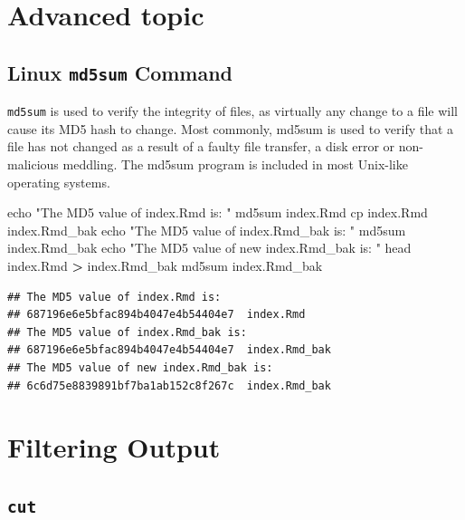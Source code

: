 \documentclass[]{book}
\makeatletter
\newenvironment{Shaded}{\begin{snugshade}}{\end{snugshade}}
\newcommand{\BuiltInTok}[1]{#1}
\newcommand{\ExtensionTok}[1]{#1}
\newcommand{\FunctionTok}[1]{\textcolor[rgb]{0.00,0.00,0.00}{#1}}
\newcommand{\NormalTok}[1]{#1}
\newcommand{\OperatorTok}[1]{\textcolor[rgb]{0.81,0.36,0.00}{\textbf{#1}}}
\newcommand{\StringTok}[1]{\textcolor[rgb]{0.31,0.60,0.02}{#1}}
\newenvironment{kframe}{%
\medskip{}
\setlength{\fboxsep}{.8em}
 \def\at@end@of@kframe{}%
 \ifinner\ifhmode%
  \def\at@end@of@kframe{\end{minipage}}%
  \begin{minipage}{\columnwidth}%
 \fi\fi%
 \def\FrameCommand##1{\hskip\@totalleftmargin \hskip-\fboxsep
 \colorbox{shadecolor}{##1}\hskip-\fboxsep
     \hskip-\linewidth \hskip-\@totalleftmargin \hskip\columnwidth}%
 \MakeFramed {\advance\hsize-\width
   \@totalleftmargin\z@ \linewidth\hsize
   \@setminipage}}%
 {\par\unskip\endMakeFramed%
 \at@end@of@kframe}
\renewenvironment{Shaded}{\begin{kframe}}{\end{kframe}}
\makeatother
\begin{document}
\hypertarget{advanced-topic}{%
\section{Advanced topic}\label{advanced-topic}}

\hypertarget{linux-md5sum-command}{%
\subsection{\texorpdfstring{Linux \texttt{md5sum} Command}{Linux md5sum Command}}\label{linux-md5sum-command}}

\texttt{md5sum} is used to verify the integrity of files, as virtually any change to a file will cause its MD5 hash to change. Most commonly, md5sum is used to verify that a file has not changed as a result of a faulty file transfer, a disk error or non-malicious meddling. The md5sum program is included in most Unix-like operating systems.

\begin{Shaded}
\begin{Highlighting}[]
\BuiltInTok{echo} \StringTok{"The MD5 value of index.Rmd is: "}
\ExtensionTok{md5sum}\NormalTok{ index.Rmd}
\FunctionTok{cp}\NormalTok{ index.Rmd index.Rmd_bak}
\BuiltInTok{echo} \StringTok{"The MD5 value of index.Rmd_bak is: "}
\ExtensionTok{md5sum}\NormalTok{ index.Rmd_bak }
\BuiltInTok{echo} \StringTok{"The MD5 value of new index.Rmd_bak is: "}
\FunctionTok{head}\NormalTok{ index.Rmd }\OperatorTok{>}\NormalTok{ index.Rmd_bak}
\ExtensionTok{md5sum}\NormalTok{ index.Rmd_bak }
\end{Highlighting}
\end{Shaded}

\begin{verbatim}
## The MD5 value of index.Rmd is: 
## 687196e6e5bfac894b4047e4b54404e7  index.Rmd
## The MD5 value of index.Rmd_bak is: 
## 687196e6e5bfac894b4047e4b54404e7  index.Rmd_bak
## The MD5 value of new index.Rmd_bak is: 
## 6c6d75e8839891bf7ba1ab152c8f267c  index.Rmd_bak
\end{verbatim}

\hypertarget{filtering-output}{%
\section{Filtering Output}\label{filtering-output}}

\hypertarget{cut}{%
\subsection{\texorpdfstring{\texttt{cut}}{cut}}\label{cut}}
\end{document}
